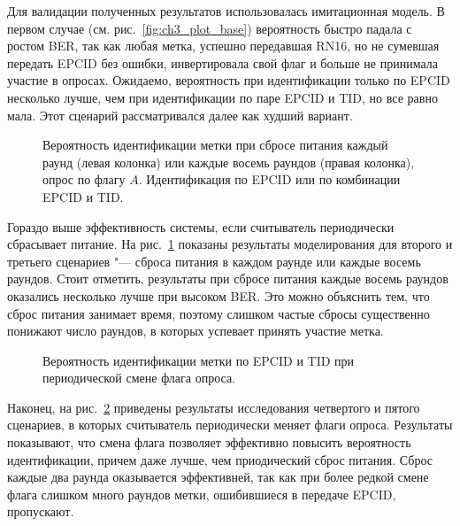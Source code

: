 Для валидации полученных результатов использовалась имитационная модель. В первом случае (см. рис.~\ref{fig:ch3_plot_base}) вероятность быстро падала с ростом BER, так как любая метка, успешно передавшая RN16, но не сумевшая передать EPCID без ошибки, инвертировала свой флаг и больше не принимала участие в опросах. Ожидаемо, вероятность при идентификации только по EPCID несколько лучше, чем при идентификации по паре EPCID и TID, но все равно мала. Этот сценарий рассматривался далее как худший вариант.

\begin{figure}[htb]
  \caption{Вероятность идентификации метки при сбросе питания каждый раунд (левая колонка) или каждые восемь раундов (правая колонка), опрос по флагу $A$. Идентификация по EPCID или по комбинации EPCID и TID.}
  \label{fig:ch3_plot_power}
\end{figure}

Гораздо выше эффективность системы, если считыватель периодически сбрасывает питание. На рис.~\ref{fig:ch3_plot_power} показаны результаты моделирования для второго и третьего сценариев "--- сброса питания в каждом раунде или каждые восемь раундов. Стоит отметить, результаты при сбросе питания каждые восемь раундов оказались несколько лучше при высоком BER. Это можно объяснить тем, что сброс питания занимает время, поэтому слишком частые сбросы существенно понижают число раундов, в которых успевает принять участие метка.

\begin{figure}[htb]
  \caption{Вероятность идентификации метки по EPCID и TID при периодической смене флага опроса.}
  \label{fig:ch3_plot_target}
\end{figure}

Наконец, на рис.~\ref{fig:ch3_plot_target} приведены результаты исследования четвертого и пятого сценариев, в которых считыватель периодически меняет флаги опроса. Результаты показывают, что смена флага позволяет эффективно повысить вероятность идентификации, причем даже лучше, чем приодический сброс питания. Сброс каждые два раунда оказывается эффективней, так как при более редкой смене флага слишком много раундов метки, ошибившиеся в передаче EPCID, пропускают.





